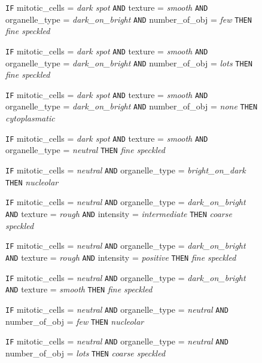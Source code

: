 \begin{figure}
\begin{algorithmic}[1]
			\State \texttt{IF} mitotic\_cells = \textit{dark spot} \texttt{AND} texture = \textit{smooth} \texttt{AND} organelle\_type = \textit{dark\_on\_bright} \texttt{AND} number\_of\_obj = \textit{few} 
			\Statex \texttt{THEN} \textit{fine speckled}
			
			\State \texttt{IF} mitotic\_cells = \textit{dark spot} \texttt{AND} texture = \textit{smooth} \texttt{AND} organelle\_type = \textit{dark\_on\_bright} \texttt{AND} number\_of\_obj = \textit{lots} 
			\Statex \texttt{THEN} \textit{fine speckled}
			
			\State \texttt{IF} mitotic\_cells = \textit{dark spot} \texttt{AND} texture = \textit{smooth} \texttt{AND} organelle\_type = \textit{dark\_on\_bright} \texttt{AND} number\_of\_obj = \textit{none} 
			\Statex \texttt{THEN} \textit{cytoplasmatic}
			
			\State \texttt{IF} mitotic\_cells = \textit{dark spot} \texttt{AND} texture = \textit{smooth} \texttt{AND} organelle\_type = \textit{neutral} 
			\Statex \texttt{THEN} \textit{fine speckled}
			
			\State \texttt{IF} mitotic\_cells = \textit{neutral} \texttt{AND} organelle\_type = \textit{bright\_on\_dark}
			\Statex \texttt{THEN} \textit{nucleolar}
			
			\State \texttt{IF} mitotic\_cells = \textit{neutral} \texttt{AND} organelle\_type = \textit{dark\_on\_bright} \texttt{AND} texture = \textit{rough} \texttt{AND} intensity = \textit{intermediate}
			\Statex \texttt{THEN} \textit{coarse speckled}
			
			\State \texttt{IF} mitotic\_cells = \textit{neutral} \texttt{AND} organelle\_type = \textit{dark\_on\_bright} \texttt{AND} texture = \textit{rough} \texttt{AND} intensity = \textit{positive}
			\Statex \texttt{THEN} \textit{fine speckled}
			
			\State \texttt{IF} mitotic\_cells = \textit{neutral} \texttt{AND} organelle\_type = \textit{dark\_on\_bright} \texttt{AND} texture = \textit{smooth}
			\Statex \texttt{THEN} \textit{fine speckled}
			
			\State \texttt{IF} mitotic\_cells = \textit{neutral} \texttt{AND} organelle\_type = \textit{neutral} \texttt{AND} number\_of\_obj = \textit{few}
			\Statex \texttt{THEN} \textit{nucleolar}
			
			\State \texttt{IF} mitotic\_cells = \textit{neutral} \texttt{AND} organelle\_type = \textit{neutral} \texttt{AND} number\_of\_obj = \textit{lots}
			\Statex \texttt{THEN} \textit{coarse speckled}
			

\end{algorithmic}
\end{figure}
